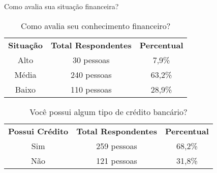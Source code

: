 \begin{apendicesenv}
\begin{table}[ht]
    \caption{Como avalia sua situação financeira?}
    \label{tab:situacao}
\end{table}

\begin{table}[ht]
    \centering
    \setlength{\extrarowheight}{3pt}  %

    \begin{center}
        \begin{minipage}{\textwidth}
            \centering
            \begin{tabular}{|c|c|c|}
                \textbf{Situação} & \textbf{Total Respondentes} & \textbf{Percentual} \\
                Alto & 30 pessoas & 7,9\% \\
                Média & 240 pessoas & 63,2\% \\
                Baixo & 110 pessoas & 28,9\% \\
            \end{tabular}
        \end{minipage}
    \end{center}

    \caption{Como avalia seu conhecimento financeiro?}
    \label{tab:educacaofinanceira}
\end{table}

\begin{table}[ht]
    \centering
    \setlength{\extrarowheight}{3pt}  %

    \begin{center}
        \begin{minipage}{\textwidth}
            \centering
            \begin{tabular}{|c|c|c|}
                \textbf{Possui Crédito} & \textbf{Total Respondentes} & \textbf{Percentual} \\
                Sim & 259 pessoas & 68,2\% \\
                Não & 121 pessoas & 31,8\% \\
            \end{tabular}
        \end{minipage}
    \end{center}

    \caption{Você possui algum tipo de crédito bancário?}
    \label{tab:pscredito}
\end{table}

\begin{table}[ht]
    \centering
    \setlength{\extrarowheight}{3pt}  %


\end{table}
\end{apendicesenv}
